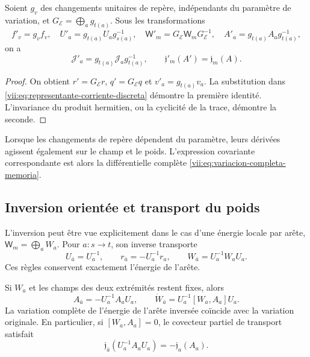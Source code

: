 \begin{proposition}
\label{vii:prop:covariancia-corriente-memoria}
Soient \(g_v\) des changements unitaires de repère, indépendants du paramètre
de variation, et \(G_{\mathcal E}=\bigoplus_a g_{t(a)}\).
Sous les transformations
\[
 f'_v=g_vf_v,\quad U'_a=g_{t(a)}U_ag_{s(a)}^{-1},\quad
 \mathsf W'_m=G_{\mathcal E}\mathsf W_mG_{\mathcal E}^{-1},\quad
 A'_a=g_{t(a)}A_ag_{t(a)}^{-1},
\]
on a
\begin{equation}
 \mathcal J'_a=g_{t(a)}\mathcal J_ag_{t(a)}^{-1},
 \qquad \mathfrak j'_m(A')=\mathfrak j_m(A).
 \label{vii:eq:covariancia-respuesta}
\end{equation}
\end{proposition}

\begin{proof}
On obtient \(r'=G_{\mathcal E}r\), \(q'=G_{\mathcal E}q\) et \(v'_a=g_{t(a)}v_a\). La substitution dans \eqref{vii:eq:representante-corriente-discreta} démontre la première identité. L'invariance du produit hermitien, ou la cyclicité de la trace, démontre la seconde.
\end{proof}

Lorsque les changements de repère dépendent du paramètre, leurs dérivées
agissent également sur le champ et le poids. L'expression covariante
correspondante est alors la différentielle complète
\eqref{vii:eq:variacion-completa-memoria}.

\subsection{Inversion orientée et transport du poids}
\label{vii:subsec:inversion-respuesta}

L'inversion peut être vue explicitement dans le cas d'une énergie locale par arête, \(\mathsf W_m=\bigoplus_a W_a\). Pour \(a:s\to t\), son inverse transporte
\[
 U_{\bar a}=U_a^{-1},\qquad
 r_{\bar a}=-U_a^{-1}r_a,\qquad
 W_{\bar a}=U_a^{-1}W_aU_a.
\]
Ces règles conservent exactement l'énergie de l'arête.

\begin{proposition}
\label{vii:prop:inversion-respuesta}
Si \(W_a\) et les champs des deux extrémités restent fixes, alors
\[
 A_{\bar a}=-U_a^{-1}A_aU_a,\qquad
 \dot W_{\bar a}=U_a^{-1}[W_a,A_a]U_a.
\]
La variation complète de l'énergie de l'arête inversée coïncide avec
la variation originale. En particulier, si \([W_a,A_a]=0\), le covecteur partiel
de transport satisfait
\begin{equation}
 \mathfrak j_{\bar a}(U_a^{-1}A_aU_a)
 =-\mathfrak j_a(A_a).
 \label{vii:eq:imparidad-transporte}
\end{equation}
\end{proposition}

